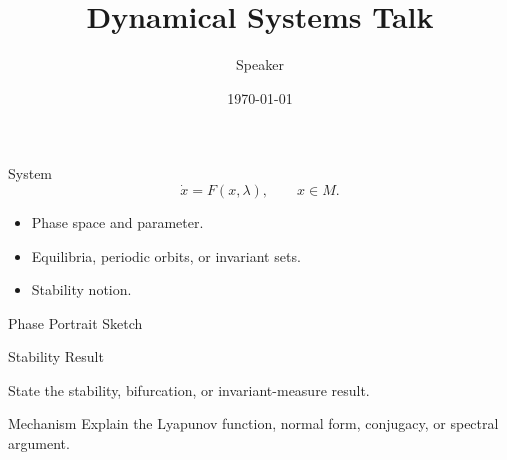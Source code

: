 \documentclass[10pt,aspectratio=169]{beamer}
\title{Dynamical Systems Talk}
\author{Speaker}
\date{\today}
\begin{document}
\begin{frame}\titlepage\end{frame}

\begin{frame}{System}
  \[
    \dot{x}=F(x,\lambda), \qquad x\in M .
  \]
  \begin{itemize}
    \item Phase space and parameter.
    \item Equilibria, periodic orbits, or invariant sets.
    \item Stability notion.
  \end{itemize}
\end{frame}

\begin{frame}{Phase Portrait Sketch}
  \centering
\end{frame}

\begin{frame}{Stability Result}
  \begin{theorem}
    State the stability, bifurcation, or invariant-measure result.
  \end{theorem}
\end{frame}

\begin{frame}{Mechanism}
  Explain the Lyapunov function, normal form, conjugacy, or spectral argument.
\end{frame}
\end{document}
